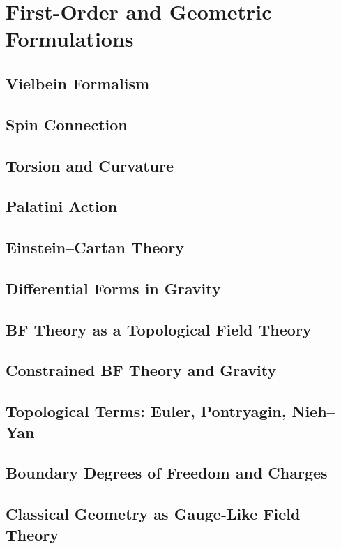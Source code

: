 \chapter{First-Order and Geometric Formulations}

\section{Vielbein Formalism}
\section{Spin Connection}
\section{Torsion and Curvature}
\section{Palatini Action}
\section{Einstein--Cartan Theory}
\section{Differential Forms in Gravity}
\section{BF Theory as a Topological Field Theory}
\section{Constrained BF Theory and Gravity}
\section{Topological Terms: Euler, Pontryagin, Nieh--Yan}
\section{Boundary Degrees of Freedom and Charges}
\section{Classical Geometry as Gauge-Like Field Theory}
